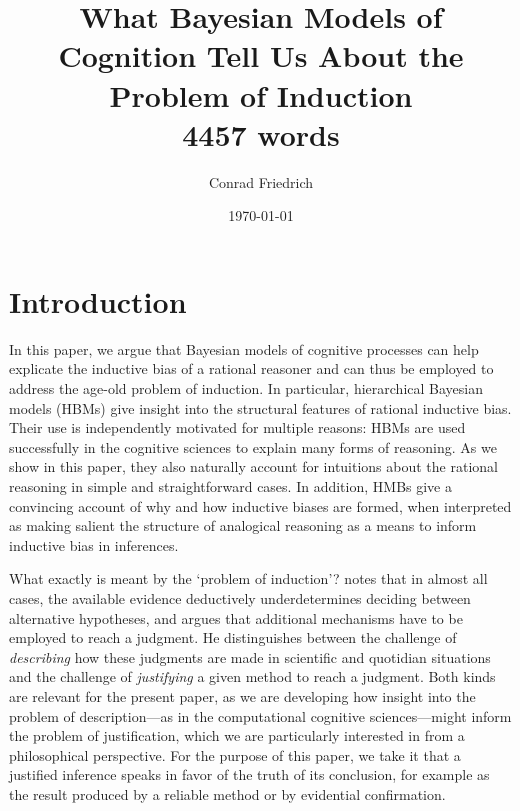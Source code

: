 \documentclass[11pt, a4paper]{article}
\author{Conrad Friedrich}
\date{\today}
\title{What Bayesian Models of Cognition Tell Us About the Problem of Induction\\\medskip
\large 4457 words}
\begin{document}
\maketitle

\thispagestyle{empty}

\section{Introduction}
\label{sec:orgd225fbe}

In this paper, we argue that Bayesian models of cognitive processes can help
explicate the inductive bias of a rational reasoner and can thus be employed to
address the age-old problem of induction. In particular, hierarchical Bayesian
models (HBMs) give insight into the structural features of rational inductive
bias. Their use is independently motivated for multiple reasons: HBMs are used
successfully in the cognitive sciences to explain many forms of reasoning. As we
show in this paper, they also naturally account for intuitions about the
rational reasoning in simple and straightforward cases. In addition, HMBs give a
convincing account of why and how inductive biases are formed, when interpreted
as making salient the structure of analogical reasoning as a means to inform
inductive bias in inferences.

What exactly is meant by the `problem of induction'?
\textcite{lipton04_infer_best_explan} notes that in almost all cases, the
available evidence deductively underdetermines deciding between alternative
hypotheses, and argues that additional mechanisms have to be employed to reach a
judgment. He distinguishes between the challenge of \textit{describing} how
these judgments are made in scientific and quotidian situations and the
challenge of \textit{justifying} a given method to reach a judgment. Both kinds
are relevant for the present paper, as we are developing how insight into the
problem of description---as in the computational cognitive sciences---might
inform the problem of justification, which we are particularly interested in
from a philosophical perspective. For the purpose of this paper, we take it that
a justified inference speaks in favor of the truth of its conclusion, for
example as the result produced by a reliable method or by evidential
confirmation.
\end{document}
